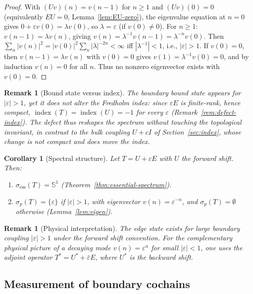 \documentclass[10pt]{amsart}
\newcommand{\1}{{\mathbb{I}}}
\newcommand{\ind}{\operatorname{index}}
\newtheorem{remark}[theorem]{Remark}
\newtheorem{cor}[theorem]{Corollary}
\numberwithin{equation}{section}
\begin{document}
\begin{proof}
With $(Uv)(n) = v(n-1)$ for $n \ge 1$ and $(Uv)(0) = 0$ (equivalently $EU=0$,
Lemma~\ref{lem:EU-zero}), the eigenvalue equation at $n=0$
gives $0 + \varepsilon v(0) = \lambda v(0)$, so $\lambda = \varepsilon$ (if $v(0)\ne0$). For
$n \ge 1$: $v(n-1) = \lambda v(n)$, giving $v(n) = \lambda^{-1} v(n-1) = \lambda^{-n} v(0)$.
Then $\sum_n |v(n)|^2 = |v(0)|^2 \sum_n |\lambda|^{-2n} < \infty$ iff $|\lambda^{-1}|<1$,
i.e., $|\varepsilon|>1$.
If $v(0) = 0$, then $v(n-1) = \lambda v(n)$ with $v(0)=0$ gives $v(1) = \lambda^{-1}v(0) = 0$,
and by induction $v(n) = 0$ for all $n$. Thus no nonzero eigenvector exists with $v(0) = 0$.
\end{proof}

\begin{remark}[Bound state versus index]
The boundary bound state appears for $|\varepsilon|>1$, yet it does not alter the Fredholm index:
since $\varepsilon E$ is finite-rank, hence compact, $\ind(T)=\ind(U)=-1$ for
every $\varepsilon$ (Remark~\ref{rem:defect-index}). The defect thus reshapes the spectrum
without touching the topological invariant, in contrast to the bulk coupling $U+cI$ of
Section~\ref{sec:index}, whose change is not compact and does move the index.
\end{remark}

\begin{cor}[Spectral structure]\label{prop:spectral}
Let $T = U + \varepsilon E$ with $U$ the forward shift. Then:
\begin{enumerate}
    \item $\sigma_{\mathrm{ess}}(T) = \mathbb{S}^1$ (Theorem~\ref{thm:essential-spectrum}).
    \item $\sigma_p(T) = \{\varepsilon\}$ if $|\varepsilon|>1$, with eigenvector
    $v(n) = \varepsilon^{-n}$, and $\sigma_p(T) = \emptyset$ otherwise (Lemma~\ref{lem:eigen}).
\end{enumerate}
\end{cor}

\begin{remark}[Physical interpretation]
The edge state exists for large boundary coupling $|\varepsilon|>1$ under the forward shift
convention. For the complementary physical picture of a decaying mode $v(n) = \varepsilon^n$
for small $|\varepsilon|<1$, one uses the adjoint operator $T^* = U^* + \bar\varepsilon E$,
where $U^*$ is the backward shift.
\end{remark}

\subsection{Measurement of boundary cochains}
\end{document}
